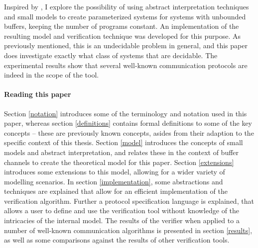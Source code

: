 Inspired by \cite{parosh}, I explore the possibility of using abstract interpretation techniques and small models to create parameterized systems for systems with unbounded buffers, keeping the number of programs constant. An implementation of the resulting model and verification technique was developed for this purpose. As previously mentioned, this is an undecidable problem in general, and this paper does  investigate exactly what class of systems that are decidable. The experimental results show that several well-known communication protocols are indeed in the scope of the tool.

\paragraph{Reading this paper} Section \ref{notation} introduces some of the terminology and notation used in this paper, whereas section \ref{definitions} contains formal definitions to some of the key concepts -- these are previously known concepts, asides from their adaption to the specific context of this thesis. Section \ref{model} introduces the concepts of small models and abstract interpretation, and relates these in the context of buffer channels to create the theoretical model for this paper. Section \ref{extensions} introduces some extensions to this model, allowing for a wider variety of modelling scenarios. In section \ref{implementation}, some abstractions and techniques are explained that allow for an efficient implementation of the verification algorithm. Further a protocol specification language is explained, that allows a user to define and use the verification tool without knowledge of the intricacies of the internal model. The results of the verifier when applied to a number of well-known communication algorithms is presented in section \ref{results}, as well as some comparisons against the results of other verification tools.

 	

